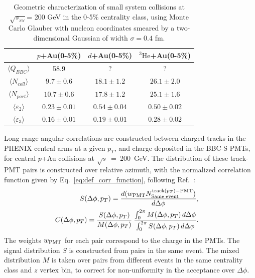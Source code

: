 \documentclass[%
reprint,
showpacs,preprintnumbers,
 amsmath,amssymb,
 aps,
]{revtex4-1}
\newcommand{\pt}{\mbox{$p_T$}\xspace}
\newcommand{\sqs}{\mbox{$\sqrt{s}$}\xspace}
\newcommand{\sqsn}{\mbox{$\sqrt{s_{_{NN}}}$}\xspace}
\newcommand{\dau}{\mbox{$d$+Au}\xspace}
\newcommand{\pau}{\mbox{$p$+Au}\xspace}
\newcommand{\hau}{\mbox{$^3\text{He}$+Au}\xspace}
\begin{document}
\begin{table}
\caption{Geometric characterization of small system collisions at \sqsn = 200 GeV in the 0-5\% centrality class, using Monte Carlo Glauber with nucleon coordinates smeared by a two-dimensional Gaussian of width $\sigma=0.4$ fm.}
\begin{ruledtabular}
\begin{tabular}{c c c c}
\label{table_geometry}
 & \pau (0-5\%) & \dau (0-5\%) & \hau (0-5\%) \\
\hline
 $\langle Q_{BBC} \rangle$ & 58.9 & ? & ? \\
 $\langle N_{coll} \rangle$ & $9.7\pm 0.6$ & $18.1\pm 1.2$ & $26.1\pm 2.0$ \\
 $\langle N_{part} \rangle$ & $10.7\pm 0.6$ & $17.8\pm 1.2$ & $25.1\pm  1.6$ \\ 
 $\langle \varepsilon_2 \rangle$ & $0.23\pm 0.01$ & $0.54\pm 0.04$ & $0.50\pm 0.02$ \\
 $\langle \varepsilon_3 \rangle$ & $0.16\pm 0.01$ & $0.19\pm 0.01$ & $0.28\pm 0.02$
\end{tabular}
\end{ruledtabular}
\end{table}

Long-range angular correlations are constructed between charged tracks in the PHENIX central arms at a given \pt, and charge deposited in the BBC-S PMTs, for central \pau collisions at \sqs~=~200~GeV. The distribution of these track-PMT pairs is constructed over relative azimuth, with the normalized correlation function given by Eq.~\ref{eq:def_corr_function}, following Ref.~\cite{PhysRevLett.115.142301}:
\begin{eqnarray}
  S(\Delta\phi,p_{T})=
  \frac{ d(w_{{\rm PMT}} N^{{\rm track}(p_{T}){\rm - PMT}}_{{\rm Same \; event}}) }{ d\Delta\phi}, & &
\label{eq31} \\
  C(\Delta\phi,p_{T}) =
          \frac{S(\Delta\phi,p_{T})}{M(\Delta\phi,p_{T})} \:
          \frac{\int_{0}^{2\pi} M(\Delta\phi,p_{T}) \, d\Delta\phi}{\int_{0}^{2\pi} S(\Delta\phi,p_{T}) \, d\Delta\phi}. & &
  \label{eq:def_corr_function}
\end{eqnarray}
The weights $w_{{\rm PMT}}$ for each pair correspond to the charge in the PMTs. The signal distribution $S$ is constructed from pairs in the same event. The mixed distribution $M$ is taken over pairs from different events in the same centrality class and $z$ vertex bin, to correct for non-uniformity in the acceptance over $\Delta \phi$.
\end{document}
